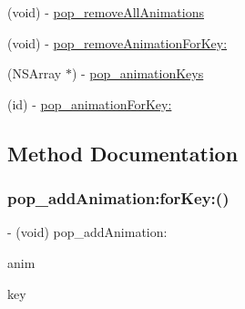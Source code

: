 \begin{DoxyCompactItemize}
(void) -\/ \mbox{\hyperlink{category_n_s_object_07_p_o_p_08_a8b24200d2a40751755a930f833582296}{pop\+\_\+remove\+All\+Animations}}
\item 
(void) -\/ \mbox{\hyperlink{category_n_s_object_07_p_o_p_08_a8ac27f1251e5b55eb426e829265d23b6}{pop\+\_\+remove\+Animation\+For\+Key\+:}}
\item 
(N\+S\+Array $\ast$) -\/ \mbox{\hyperlink{category_n_s_object_07_p_o_p_08_a1651078990a6428516ef74bc0eed7480}{pop\+\_\+animation\+Keys}}
\item 
(id) -\/ \mbox{\hyperlink{category_n_s_object_07_p_o_p_08_a517e269829d65c37f0541e49a3d18210}{pop\+\_\+animation\+For\+Key\+:}}
\end{DoxyCompactItemize}


\subsection{Method Documentation}
\mbox{\label{category_n_s_object_07_p_o_p_08_aa41ce0061104fecaceafcbc959967013}} 
\subsubsection{\texorpdfstring{pop\+\_\+add\+Animation\+:for\+Key\+:()}{pop\_addAnimation:forKey:()}\hspace{0.1cm}{\footnotesize\ttfamily [1/3]}}
{\footnotesize\ttfamily -\/ (void) pop\+\_\+add\+Animation\+: \begin{DoxyParamCaption}\item[{(\mbox{\hyperlink{interface_p_o_p_animation}{P\+O\+P\+Animation}} $\ast$)}]{anim }\item[{forKey:(N\+S\+String $\ast$)}]{key }\end{DoxyParamCaption}}

